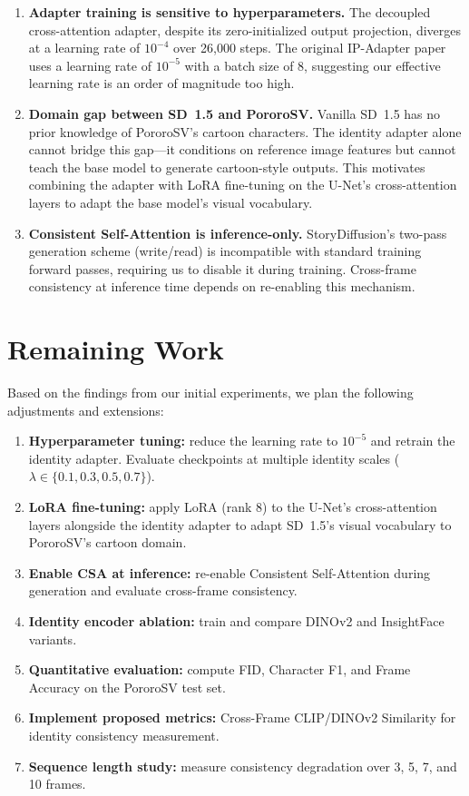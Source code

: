 \documentclass[11pt]{article}
\begin{document}
\begin{enumerate}[leftmargin=*]
    \item \textbf{Adapter training is sensitive to hyperparameters.} The decoupled cross-attention adapter, despite its zero-initialized output projection, diverges at a learning rate of $10^{-4}$ over 26,000 steps. The original IP-Adapter paper uses a learning rate of $10^{-5}$ with a batch size of 8, suggesting our effective learning rate is an order of magnitude too high.

    \item \textbf{Domain gap between SD~1.5 and PororoSV.} Vanilla SD~1.5 has no prior knowledge of PororoSV's cartoon characters. The identity adapter alone cannot bridge this gap---it conditions on reference image features but cannot teach the base model to generate cartoon-style outputs. This motivates combining the adapter with LoRA fine-tuning on the U-Net's cross-attention layers to adapt the base model's visual vocabulary.

    \item \textbf{Consistent Self-Attention is inference-only.} StoryDiffusion's two-pass generation scheme (write/read) is incompatible with standard training forward passes, requiring us to disable it during training. Cross-frame consistency at inference time depends on re-enabling this mechanism.
\end{enumerate}

\section{Remaining Work}

Based on the findings from our initial experiments, we plan the following adjustments and extensions:

\begin{enumerate}[leftmargin=*]
    \item \textbf{Hyperparameter tuning:} reduce the learning rate to $10^{-5}$ and retrain the identity adapter. Evaluate checkpoints at multiple identity scales ($\lambda \in \{0.1, 0.3, 0.5, 0.7\}$).
    \item \textbf{LoRA fine-tuning:} apply LoRA (rank 8) to the U-Net's cross-attention layers alongside the identity adapter to adapt SD~1.5's visual vocabulary to PororoSV's cartoon domain.
    \item \textbf{Enable CSA at inference:} re-enable Consistent Self-Attention during generation and evaluate cross-frame consistency.
    \item \textbf{Identity encoder ablation:} train and compare DINOv2 and InsightFace variants.
    \item \textbf{Quantitative evaluation:} compute FID, Character F1, and Frame Accuracy on the PororoSV test set.
    \item \textbf{Implement proposed metrics:} Cross-Frame CLIP/DINOv2 Similarity for identity consistency measurement.
    \item \textbf{Sequence length study:} measure consistency degradation over 3, 5, 7, and 10 frames.
\end{enumerate}
\end{document}
